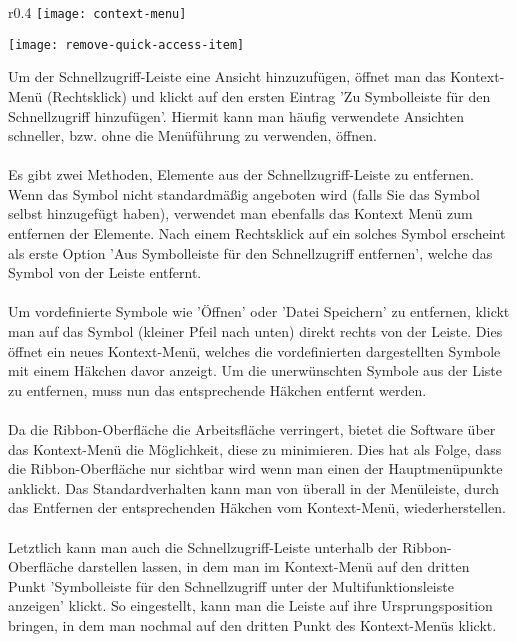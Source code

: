 \begin{wrapfigure}{r}{0.4\textwidth}
	\vspace{-4pt}
	\texttt{[image: context-menu]}
	\vspace{-5pt}
	\caption{Kontext Menü}
	\label{fig:context-menu}
	\vspace{50pt}
	\texttt{[image: remove-quick-access-item]}
	\vspace{-5pt}
	\caption{Vordefinierte Symbole\newline Entfernen}
	\label{fig:remove-quick-access-item}
	\vspace{4pt}
\end{wrapfigure}

\noindent
Um der Schnellzugriff-Leiste eine Ansicht hinzuzufügen, öffnet man das Kontext-Menü (Rechtsklick) und klickt auf den ersten Eintrag 'Zu Symbolleiste für den Schnellzugriff hinzufügen'. Hiermit kann man häufig verwendete Ansichten schneller, bzw. ohne die Menüführung zu verwenden, öffnen.\\
\\
Es gibt zwei Methoden, Elemente aus der Schnellzugriff-Leiste zu entfernen. Wenn das Symbol nicht standardmäßig angeboten wird (falls Sie das Symbol selbst hinzugefügt haben), verwendet man ebenfalls das Kontext Menü zum entfernen der Elemente. Nach einem Rechtsklick auf ein solches Symbol erscheint als erste Option 'Aus Symbolleiste für den Schnellzugriff entfernen', welche das Symbol von der Leiste entfernt.\\
\\
Um vordefinierte Symbole wie 'Öffnen' oder 'Datei Speichern' zu entfernen, klickt man auf das Symbol (kleiner Pfeil nach unten) direkt rechts von der Leiste. Dies öffnet ein neues Kontext-Menü, welches die vordefinierten dargestellten Symbole mit einem Häkchen davor anzeigt. Um die unerwünschten Symbole aus der Liste zu entfernen, muss nun das entsprechende Häkchen entfernt werden.\\
\\
Da die Ribbon-Oberfläche die Arbeitsfläche verringert, bietet die Software über das Kontext-Menü die Möglichkeit, diese zu minimieren. Dies hat als Folge, dass die Ribbon-Oberfläche nur sichtbar wird wenn man einen der Hauptmenüpunkte anklickt. Das Standardverhalten kann man von überall in der Menüleiste, durch das Entfernen der entsprechenden Häkchen vom Kontext-Menü, wiederherstellen.\\
\\
Letztlich kann man auch die Schnellzugriff-Leiste unterhalb der Ribbon-Oberfläche darstellen lassen, in dem man im Kontext-Menü auf den dritten Punkt 'Symbolleiste für den Schnellzugriff unter der Multifunktionsleiste anzeigen' klickt. So eingestellt, kann man die Leiste auf ihre Ursprungsposition bringen, in dem man nochmal auf den dritten Punkt des Kontext-Menüs klickt.

